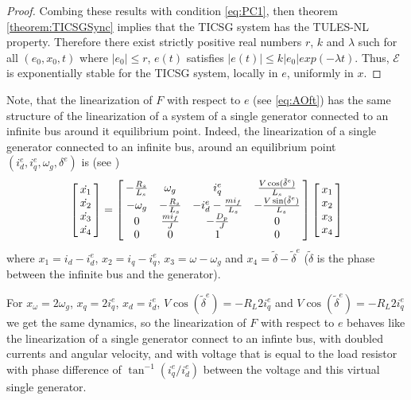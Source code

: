 \documentclass[letterpaper,10pt,conference]{ieeeconf}
\renewcommand{\l}    {{\lambda}}
\renewcommand{\o}    {{\omega}}
\newcommand{\nm}     {{\hbox{\hskip -3pt}}}
\newcommand{\Emscr}  {{\mathcal{E}}}
\begin{document}
\begin{proof}
Combing these results with condition \eqref{eq:PC1}, then theorem
\ref{theorem:TICSGSync} implies that the TICSG system has the TULES-NL
property. Therefore there exist strictly positive real numbers $r$,
$k$ and $\l$ such for all $(e_0,x_0,t)$ where $\left| e_0 \right|
\leq r$, $e(t)$ satisfies $\left|e(t)\right|\leq k\left|e_0\right|
exp(-\l t)$. Thus, $\Emscr$ is exponentially stable for the TICSG 
system, locally in $e$, uniformly in $x$.
\end{proof}

Note, that the linearization of $F$ with respect to $e$ (see
\eqref{eq:AOft}) has the same structure of the linearization of a
system of a single generator connected to an infinite bus around it
equilibrium point. Indeed, the linearization of a single generator
connected to an infinite bus, around an equilibrium point
$(i^e_d,i^e_q,\o_g, \delta^e)$ is (see \cite[formula (3.4)]{NaWe:15})
$$ \left[\nm\begin{array}{c} \dot{x_1} \\ \dot{x_2 }\\ \dot{x_3} \\
   \dot{x_4} \end{array}\nm\right]=\left[\nm\begin{array}{cccc}
   -\frac{R_s}{L_s} & \omega_g & i_q^e & \frac{V\cos(\tilde
   {\delta}^e)}{L_s}\\ -\o_g & -\frac{R_s}{L_s} & -i_d^e-\frac{mi_f}
   {L_s} & -\frac{V\sin(\tilde{\delta}^e)}{L_s}\\ 0 & \frac{mi_{f}}
   {J} & -\frac{D_{p}}{J} & 0\\ 0 & 0 & 1 & 0 \end{array}\nm\right]  
   \left[\nm\begin{array}{c} x_1 \\ x_2 \\ x_3 \\ x_4
   \end{array}\nm\right]$$
where $x_1 = i_d-i^e_d$, $x_2 = i_q-i_q^e$, $x_3=\o-\o_g$ and
$x_4= \tilde{\delta} - \tilde{\delta}^e$ ($\tilde{\delta}$ is the
phase between the infinite bus and the generator).

For $x_\o=2\o_g$, $x_q=2 i_q^e$, $x_d=i_d^e$, $V\cos(\tilde{\delta}^e)
= -R_L 2 i_q^e$ and $V \cos(\tilde{\delta}^e) = -R_L 2 i_q^e$ we get
the same dynamics, so the linearization of $F$ with respect to $e$
behaves like the linearization of a single generator connect to an
infinte bus, with doubled currents and angular velocity, and with
voltage that is equal to the load resistor with phase difference of
$\tan^{-1}\left(i_q^e / i_d^e\right)$ between the voltage and this
virtual single generator.
\end{document}
